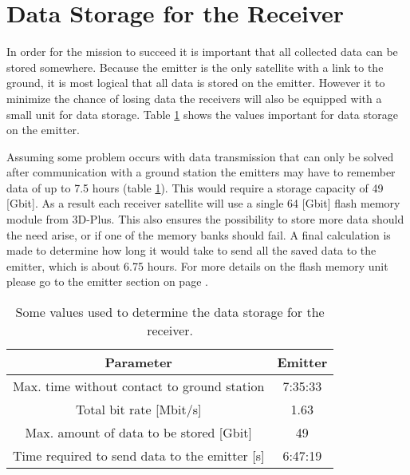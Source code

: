 \section{Data Storage for the Receiver}
\label{DSReceiver}

In order for the mission to succeed it is important that all collected data can be stored somewhere. Because the emitter is the only satellite with a link to the ground, it is most logical that all data is stored on the emitter. However it to minimize the chance of losing data the receivers will also be equipped with a small unit for data storage. Table \ref{DSReceiverTable} shows the values important for data storage on the emitter. 

Assuming some problem occurs with data transmission that can only be solved after communication with a ground station the emitters may have to remember data of up to 7.5 hours (table \ref{DSReceiverTable}). This would require a storage capacity of 49 [Gbit]. As a result each receiver satellite will use a single 64 [Gbit] flash memory module from 3D-Plus. This also ensures the possibility to store more data should the need arise, or if one of the memory banks should fail. A final calculation is made to determine how long it would take to send all the saved data to the emitter, which is about 6.75 hours. For more details on the flash memory unit please go to the emitter section on page \pageref{DSEmitter}.

\begin{table}
\centering
\begin{tabular}{c|c}
\textbf{Parameter}  & \textbf{Emitter} \\\hline\hline
	Max. time without contact to ground station & 7:35:33 \\
	Total bit rate [Mbit/s] & 1.63 \\
	Max. amount of data to be stored [Gbit] & 49 \\
	Time required to send data to the emitter [s] & 6:47:19 \\
\end{tabular}
\caption{Some values used to determine the data storage for the receiver.}
\label{DSReceiverTable}
\end{table}